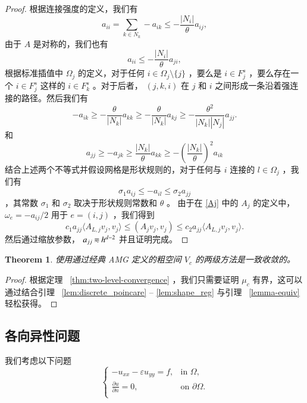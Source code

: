 \documentclass[12pt]{acta_2011xz}
\newcommand{\eqqsim}{\mathbin{\rotatebox[origin=c]{180}{\ensuremath{\cong}}}}
\newtheorem{theorem}{Theorem}[section]
\begin{document}
   \begin{proof}根据连接强度的定义，我们有
   \[
        a_{ii} =\sum_{k\in N_k}-a_{ik} \le -\frac{|N_i|}{\theta}a_{ij},
    \]    由于    $A$    是对称的，我们也有
   \[
        a_{ii}\le -\frac{|N_i|}{\theta}a_{ji},
    \]    根据标准插值中    $\Omega_j$    的定义，对于任何    $i\in \Omega_j\setminus \{ j \} $    ，要么是    $i\in F_j^s$    ，要么存在一个    $i\in F_j^s$    这样的    $i\in F_{k}^s$    。对于后者，   $(j, k, i)$    在    $j$    和    $i$    之间形成一条沿着强连接的路径。然后我们有
   \[
        -a_{ik} \ge  -\frac{\theta}{|N_k|} a_{kk} \ge -\frac{\theta}{|N_k|} a_{kj}\ge -\frac{\theta^2}{|N_k||N_j|} a_{jj}.
    \]    和
   \[
        a_{jj}\ge -a_{jk} \ge \frac{|N_k|}{\theta}a_{kk} \ge -\left(\frac{|N_k|}{\theta}\right)^2a_{ik} 
    \]    结合上述两个不等式并假设网格是形状规则的，对于任何与    $i$    连接的    $l\in \Omega_j$    ，我们有
   \[
        \sigma_1 a_{ij} \le -a_{il} \le \sigma_2 a_{jj}
        \]    ，其常数    $\sigma_1$    和    $\sigma_2$    取决于形状规则常数和    $\theta$    。
由于在    \eqref{Aj}    中的    $A_j$    的定义中，   $\omega_e=-a_{ij}/2$    用于    $e=(i, j)$    ，我们得到
   \begin{equation}
    c_1 a_{jj}\langle A_{L,j} v_j, v_j\rangle \le ( A_jv_j, v_j) \le c_2 a_{jj}\langle A_{L,j} v_j, v_j\rangle.
\end{equation}    然后通过缩放参数，   $a_{jj}\eqqsim h^{d-2}$    并且证明完成。  \end{proof}     

   \begin{theorem}使用通过经典 AMG 定义的粗空间    $V_c$    的两级方法是一致收敛的。  \end{theorem}    
   \begin{proof}根据定理~    \ref{thm:two-level-convergence}    ，我们只需要证明    $\mu_c$    有界，这可以通过结合引理~    \ref{lem:discrete_poincare}    --    \ref{lem:shape_reg}    与引理~    \ref{lemma-equiv}    轻松获得。  \end{proof}     

   \subsection{各向异性问题  }       \label{sec:aniso}     

我们考虑以下问题
   \begin{equation}\label{anisotropic}
    \begin{cases}
        -u_{xx}-\varepsilon u_{yy} = f, & \text{in } \Omega, \\ 
        \frac{\partial u}{\partial n}= 0, & \text{on } \partial \Omega. \\ 
    \end{cases}
\end{equation}     
\end{document}
